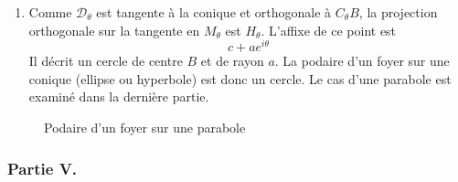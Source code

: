 \begin{enumerate}
\item Comme $\mathcal D_\theta$ est tangente à la conique et orthogonale à $C_\theta B$, la projection orthogonale sur la tangente en $M_\theta$ est $H_\theta$. L'affixe de ce point est 
\begin{displaymath}
 c+ae^{i\theta}
\end{displaymath}
Il décrit un cercle de centre $B$ et de rayon $a$. La podaire d'un foyer sur une conique (ellipse ou hyperbole) est donc un cercle. Le cas d'une parabole est examiné dans la dernière partie.
\end{enumerate}

\begin{figure}[ht]
 \centering

\caption{Podaire d'un foyer sur une parabole}
\label{fig:Cconi2_6}
\end{figure}
\subsubsection*{Partie V.}
